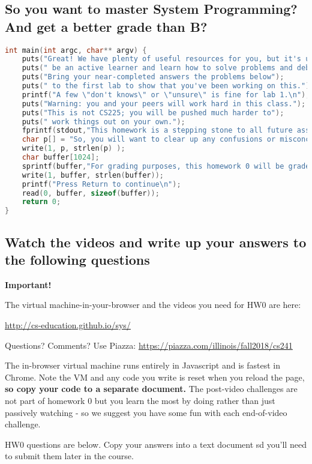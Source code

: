 \subsection{So you want to master System Programming? And get a better grade than B?}
\begin{lstlisting}[language=C]
int main(int argc, char** argv) {
	puts("Great! We have plenty of useful resources for you, but it's up to you to");
	puts(" be an active learner and learn how to solve problems and debug code.");
	puts("Bring your near-completed answers the problems below");
	puts(" to the first lab to show that you've been working on this.");
	printf("A few \"don't knows\" or \"unsure\" is fine for lab 1.\n"); 
	puts("Warning: you and your peers will work hard in this class.");
	puts("This is not CS225; you will be pushed much harder to");
	puts(" work things out on your own.");
	fprintf(stdout,"This homework is a stepping stone to all future assignments.\n");
	char p[] = "So, you will want to clear up any confusions or misconceptions.\n";
	write(1, p, strlen(p) );
	char buffer[1024];
	sprintf(buffer,"For grading purposes, this homework 0 will be graded as part of your lab %d work.\n", 1);
	write(1, buffer, strlen(buffer));
	printf("Press Return to continue\n");
	read(0, buffer, sizeof(buffer));
	return 0;
}
\end{lstlisting}

\subsection{Watch the videos and write up your answers to the following questions}

\textbf{Important!}

The virtual machine-in-your-browser and the videos you need for HW0 are here:

\url{http://cs-education.github.io/sys/}

Questions? Comments? Use Piazza:
\url{https://piazza.com/illinois/fall2018/cs241}

The in-browser virtual machine runs entirely in Javascript and is fastest in Chrome. Note the VM and any code you write is reset when you reload the page, \textbf{so copy your code to a separate document.} The post-video challenges are not part of homework 0 but you learn the most by doing rather than just passively watching - so we suggest you have some fun with each end-of-video challenge.

HW0 questions are below. Copy your answers into a text document sd you'll need to submit them later in the course.

